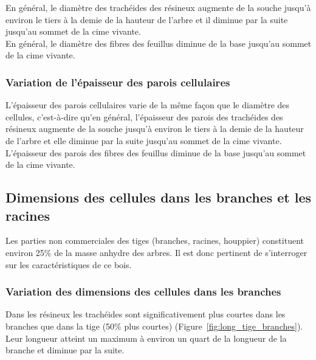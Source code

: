 En général, le diamètre des trachéides des résineux augmente de la souche jusqu'à environ le tiers à la demie de la hauteur de l'arbre et il diminue par la suite jusqu'au sommet de la cime vivante.\\

En général, le diamètre des fibres des feuillus diminue de la base jusqu'au sommet de la cime vivante.

\subsubsection{Variation de l'épaisseur des parois cellulaires}

L'épaisseur des parois cellulaires varie de la même façon que le diamètre des cellules, c'est-à-dire qu'en général, l'épaisseur des parois des trachéides des résineux augmente de la souche jusqu'à environ le tiers à la demie de la hauteur de l'arbre et elle diminue par la suite jusqu'au sommet de la cime vivante.\\

L'épaisseur des parois des fibres des feuillus diminue de la base jusqu'au sommet de la cime vivante.
%


\subsection{Dimensions des cellules dans les branches et les racines}

Les parties non commerciales des tiges (branches, racines, houppier) constituent environ 25\% de la masse anhydre des arbres. Il est donc pertinent de s'interroger sur les caractéristiques de ce bois.


\subsubsection{Variation des dimensions des cellules dans les branches}

Dans les résineux les trachéides sont significativement plus courtes dans les branches que dans la tige (50\% plus courtes) (Figure~\ref{fig:long_tige_branches}). Leur longueur atteint un maximum à environ un quart de la longueur de la branche et diminue par la suite.\\

